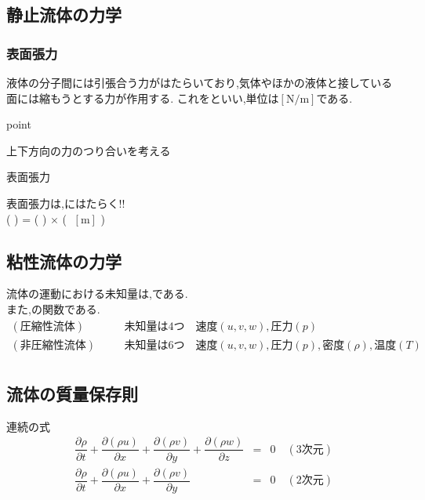 \documentclass[a4paper]{jsarticle}
\begin{document}
\subsection{静止流体の力学}
\subsubsection{表面張力}
液体の分子間には引張合う力がはたらいており,気体やほかの液体と接している面には縮もうとする力が作用する.
これをといい,単位は$\left[\mathrm{N/m}\right]$である.
\begin{itembox}[l]{point}
    \begin{center}
        上下方向の力のつり合いを考える\\
    \end{center}
\end{itembox}
\begin{itembox}[l]{表面張力}
    \begin{center}
        表面張力は,にはたらく!!\\
        (  ) = ( ) $\times$ ( $\;\left[\mathrm{m}\right]$ )
    \end{center}
\end{itembox}
\subsection{粘性流体の力学}
流体の運動における未知量は,である.\\
また,の関数である.\\
\begin{eqnarray*}
    (圧縮性流体)&&\quad 未知量は4つ\quad 速度\left(u,v,w\right),圧力\left(p\right)\\
    (非圧縮性流体)&&\quad 未知量は6つ\quad 速度\left(u,v,w\right),圧力\left(p\right),密度\left(\rho\right),温度\left(T\right)\\
\end{eqnarray*}
\subsection{流体の質量保存則}
\begin{itembox}[l]{連続の式}
    \begin{eqnarray*}
        \dfrac{\partial\rho}{\partial t}+\dfrac{\partial \left(\rho u\right)}{\partial x}+\dfrac{\partial \left(\rho v\right)}{\partial y}+\dfrac{\partial \left(\rho w\right)}{\partial z}&=&0\quad(3次元)\\
        \dfrac{\partial\rho}{\partial t}+\dfrac{\partial \left(\rho u\right)}{\partial x}+\dfrac{\partial \left(\rho v\right)}{\partial y}&=&0\quad(2次元)\\
    \end{eqnarray*}
\end{itembox}
\end{document}
